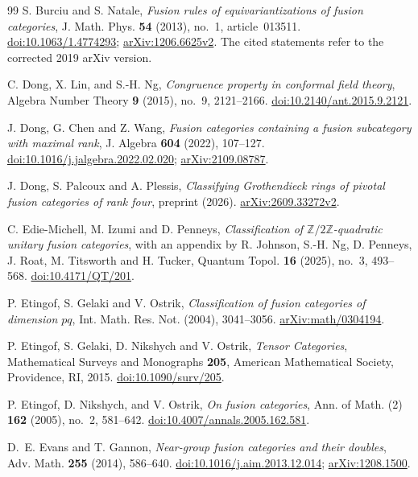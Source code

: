 \documentclass[11pt,a4paper]{article}
\numberwithin{equation}{section}
\begin{document}
\begin{thebibliography}{99}
S. Burciu and S. Natale,
\emph{Fusion rules of equivariantizations of fusion categories},
J. Math. Phys. \textbf{54} (2013), no.~1, article~013511.
\href{https://doi.org/10.1063/1.4774293}{doi:10.1063/1.4774293};
\href{https://arxiv.org/abs/1206.6625v2}{arXiv:1206.6625v2}.
The cited statements refer to the corrected 2019 arXiv version.

C. Dong, X. Lin, and S.-H. Ng, \emph{Congruence property in conformal
field theory}, Algebra Number Theory \textbf{9} (2015), no.~9, 2121--2166.
\href{https://doi.org/10.2140/ant.2015.9.2121}{doi:10.2140/ant.2015.9.2121}.

 J. Dong, G. Chen and Z. Wang,
\emph{Fusion categories containing a fusion subcategory with maximal rank},
J. Algebra \textbf{604} (2022), 107--127.
\href{https://doi.org/10.1016/j.jalgebra.2022.02.020}{doi:10.1016/j.jalgebra.2022.02.020};
\href{https://arxiv.org/abs/2109.08787}{arXiv:2109.08787}.

 J. Dong, S. Palcoux and A. Plessis,
\emph{Classifying Grothendieck rings of pivotal fusion categories of rank four},
preprint (2026).
\href{https://arxiv.org/abs/2609.33272v2}{arXiv:2609.33272v2}.

 C. Edie-Michell, M. Izumi and D. Penneys,
\emph{Classification of $\mathbb Z/2\mathbb Z$-quadratic unitary fusion categories},
with an appendix by R. Johnson, S.-H. Ng, D. Penneys, J. Roat,
M. Titsworth and H. Tucker,
Quantum Topol. \textbf{16} (2025), no.~3, 493--568.
\href{https://doi.org/10.4171/QT/201}{doi:10.4171/QT/201}.

 P. Etingof, S. Gelaki and V. Ostrik, \emph{Classification of fusion categories of dimension $pq$}, Int. Math. Res. Not. (2004), 3041--3056. \href{https://arxiv.org/abs/math/0304194}{arXiv:math/0304194}.

 P. Etingof, S. Gelaki, D. Nikshych and V. Ostrik,
\emph{Tensor Categories}, Mathematical Surveys and Monographs
\textbf{205}, American Mathematical Society, Providence, RI, 2015.
\href{https://doi.org/10.1090/surv/205}{doi:10.1090/surv/205}.

P. Etingof, D. Nikshych, and V. Ostrik, \emph{On fusion categories},
Ann. of Math. (2) \textbf{162} (2005), no.~2, 581--642.
\href{https://doi.org/10.4007/annals.2005.162.581}{doi:10.4007/annals.2005.162.581}.

D.~E. Evans and T. Gannon,
\emph{Near-group fusion categories and their doubles},
Adv. Math. \textbf{255} (2014), 586--640.
\href{https://doi.org/10.1016/j.aim.2013.12.014}{doi:10.1016/j.aim.2013.12.014};
\href{https://arxiv.org/abs/1208.1500}{arXiv:1208.1500}.


\end{thebibliography}
\end{document}
